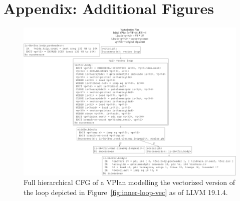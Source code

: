 \documentclass[sigplan,11pt,nonacm]{acmart}
\begin{document}


\appendix

\section{Appendix: Additional Figures}\label{appendix-figures}

\begin{figure}
  \centering
  \includegraphics[width=\textwidth]{images/inner-loop-vplan-hcfg.png}
  \caption{Full hierarchical CFG of a VPlan modelling the vectorized version of the loop 
  depicted in Figure~\ref{fig:inner-loop-vec} as of LLVM 19.1.4.}
  \label{fig:inner-loop-vplan-hcfg}
\end{figure}
\end{document}

